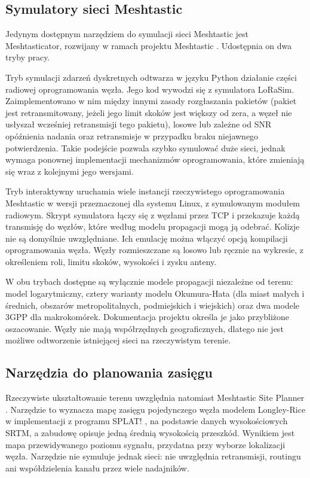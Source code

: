 \documentclass[12pt,a4paper,twoside]{report}
\theoremstyle{definition} %
\begin{document}
\subsection{Symulatory sieci Meshtastic}

Jedynym dostępnym narzędziem do symulacji sieci Meshtastic jest Meshtasticator, rozwijany w ramach projektu Meshtastic \cite{meshtasticator}. Udostępnia on dwa tryby pracy.

Tryb symulacji zdarzeń dyskretnych odtwarza w języku Python działanie części radiowej oprogramowania węzła. Jego kod wywodzi się z symulatora LoRaSim. Zaimplementowano w nim między innymi zasady rozgłaszania pakietów (pakiet jest retransmitowany, jeżeli jego limit skoków jest większy od zera, a węzeł nie usłyszał wcześniej retransmisji tego pakietu), losowe lub zależne od SNR opóźnienia nadania oraz retransmisje w przypadku braku niejawnego potwierdzenia. Takie podejście pozwala szybko symulować duże sieci, jednak wymaga ponownej implementacji mechanizmów oprogramowania, które zmieniają się wraz z kolejnymi jego wersjami.

Tryb interaktywny uruchamia wiele instancji rzeczywistego oprogramowania Meshtastic w wersji przeznaczonej dla systemu Linux, z symulowanym modułem radiowym. Skrypt symulatora łączy się z węzłami przez TCP i przekazuje każdą transmisję do węzłów, które według modelu propagacji mogą ją odebrać. Kolizje nie są domyślnie uwzględniane. Ich emulację można włączyć opcją kompilacji oprogramowania węzła. Węzły rozmieszczane są losowo lub ręcznie na wykresie, z określeniem roli, limitu skoków, wysokości i zysku anteny.

W obu trybach dostępne są wyłącznie modele propagacji niezależne od terenu: model logarytmiczny, cztery warianty modelu Okumura-Hata (dla miast małych i średnich, obszarów metropolitalnych, podmiejskich i wiejskich) oraz dwa modele 3GPP dla makrokomórek. Dokumentacja projektu określa je jako przybliżone oszacowanie. Węzły nie mają współrzędnych geograficznych, dlatego nie jest możliwe odtworzenie istniejącej sieci na rzeczywistym terenie.

\subsection{Narzędzia do planowania zasięgu}

Rzeczywiste ukształtowanie terenu uwzględnia natomiast Meshtastic Site Planner \cite{site_planner}. Narzędzie to wyznacza mapę zasięgu pojedynczego węzła modelem Longley-Rice w implementacji z programu SPLAT! \cite{splat}, na podstawie danych wysokościowych SRTM, a zabudowę opisuje jedną średnią wysokością przeszkód. Wynikiem jest mapa przewidywanego poziomu sygnału, przydatna przy wyborze lokalizacji węzła. Narzędzie nie symuluje jednak sieci: nie uwzględnia retransmisji, routingu ani współdzielenia kanału przez wiele nadajników.
\end{document}
